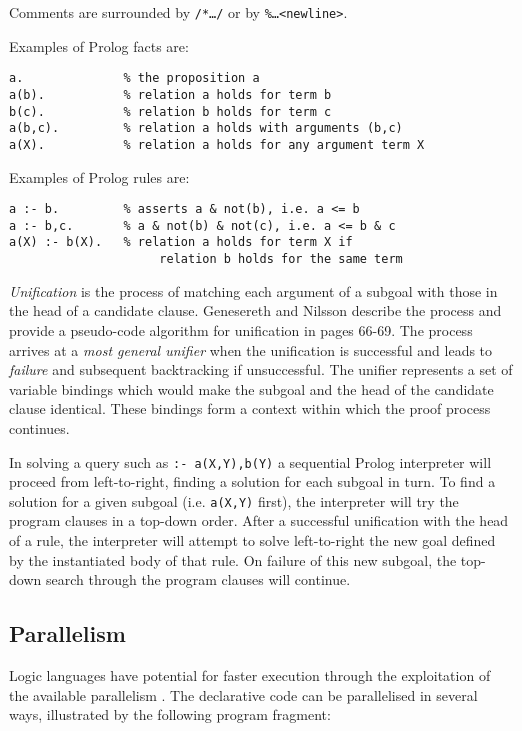 Comments are surrounded by \texttt{/*\ldots*/} or by \texttt{\%\ldots<newline>}.

Examples of Prolog facts are:
\begin{verbatim}
a.              % the proposition a
a(b).           % relation a holds for term b
b(c).           % relation b holds for term c
a(b,c).         % relation a holds with arguments (b,c)
a(X).           % relation a holds for any argument term X
\end{verbatim}

Examples of Prolog rules are:
\begin{verbatim}
a :- b.         % asserts a & not(b), i.e. a <= b
a :- b,c.       % a & not(b) & not(c), i.e. a <= b & c
a(X) :- b(X).   % relation a holds for term X if
                     relation b holds for the same term
\end{verbatim}

\textit{Unification} is the process of matching each argument of a subgoal with
those in the head of a candidate clause.  Genesereth and Nilsson describe the
process and provide a pseudo-code algorithm for unification in \cite{GN86} pages 66-69.
The process arrives at a \textit{most general unifier} when the unification is successful
and leads to \textit{failure} and subsequent backtracking if unsuccessful.  The
unifier represents a set of variable bindings which would make the subgoal and the
head of the candidate clause identical.  These bindings form a context within which the
proof process continues.

In solving a query such as \texttt{:- a(X,Y),b(Y)} a sequential Prolog interpreter
will proceed from left-to-right, finding a solution for each subgoal in turn.  To
find a solution for a given subgoal (i.e. \texttt{a(X,Y)} first), the interpreter will
try the program clauses in a top-down order.  After a successful unification with the
head of a rule, the interpreter will attempt to solve left-to-right
the new goal defined by the
instantiated body of that rule.  On failure of this new subgoal, the top-down
search through the program clauses will continue.

\subsection{Parallelism}

Logic languages have potential for faster execution through the
exploitation of the available parallelism \cite{Tic91}.  The 
declarative code can be parallelised in several ways, illustrated by the
following program fragment:

